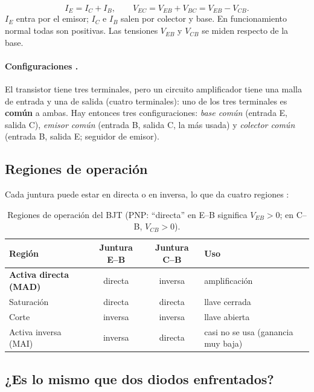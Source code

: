 \begin{clave}
\[
  I_E = I_C + I_B,
  \qquad
  V_{EC} = V_{EB} + V_{BC} = V_{EB} - V_{CB}.
\]
$I_E$ entra por el emisor; $I_C$ e $I_B$ salen por colector y base. En funcionamiento normal
todas son positivas. Las tensiones $V_{EB}$ y $V_{CB}$ se miden respecto de la base.
\end{clave}

\paragraph{Configuraciones .} El transistor tiene tres terminales, pero un circuito
amplificador tiene una malla de entrada y una de salida (cuatro terminales): uno de los tres
terminales es \textbf{común} a ambas. Hay entonces tres configuraciones: \emph{base común}
(entrada E, salida C), \emph{emisor común} (entrada B, salida C, la más usada) y
\emph{colector común} (entrada B, salida E; seguidor de emisor).

\subsection{Regiones de operación}

Cada juntura puede estar en directa o en inversa, lo que da cuatro regiones :

\begin{table}[H]
\centering\small
\caption{Regiones de operación del BJT (PNP: ``directa'' en E--B significa $V_{EB}>0$; en
C--B, $V_{CB}>0$).}
\label{tab:regiones}
\begin{tabular}{lccl}
\toprule
Región & Juntura E--B & Juntura C--B & Uso \\
\midrule
\textbf{Activa directa (MAD)} & directa & inversa & amplificación \\
Saturación                   & directa & directa & llave cerrada \\
Corte                        & inversa & inversa & llave abierta \\
Activa inversa (MAI)         & inversa & directa & casi no se usa (ganancia muy baja) \\
\bottomrule
\end{tabular}
\end{table}

\subsection{¿Es lo mismo que dos diodos enfrentados?}

